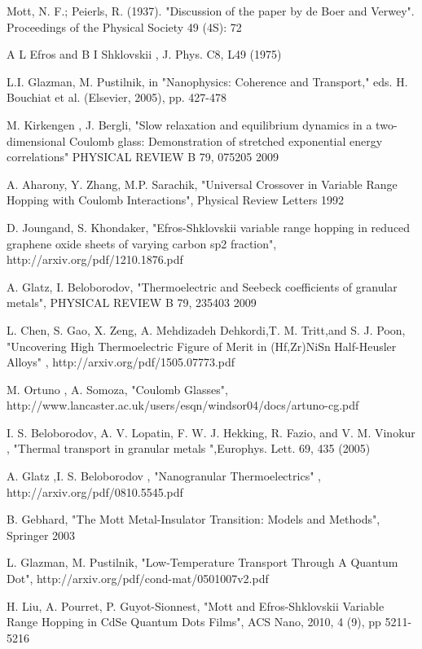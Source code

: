 \begin{thebibliography}{10}
 Mott, N. F.; Peierls, R. (1937). "Discussion of the paper by de Boer and Verwey". Proceedings of the Physical Society 49 (4S): 72

 A L Efros and B I Shklovskii , J. Phys. C8, L49 (1975)

 L.I. Glazman, M. Pustilnik, in "Nanophysics: Coherence and Transport," eds. H. Bouchiat et al. (Elsevier, 2005), pp. 427-478

 M. Kirkengen , J. Bergli, "Slow relaxation and equilibrium dynamics in a two-dimensional Coulomb glass: Demonstration of stretched exponential energy correlations" PHYSICAL REVIEW B 79, 075205 2009

 A. Aharony, Y. Zhang, M.P. Sarachik, "Universal Crossover in Variable Range Hopping with Coulomb Interactions", Physical Review Letters 1992

 D. Joungand, S. Khondaker, "Efros-Shklovskii variable range hopping in reduced graphene oxide sheets of varying carbon sp2 fraction", http://arxiv.org/pdf/1210.1876.pdf

 A. Glatz, I. Beloborodov, "Thermoelectric and Seebeck coefficients of granular metals", PHYSICAL REVIEW B 79, 235403 2009

 L. Chen, S. Gao, X. Zeng, A. Mehdizadeh Dehkordi,T. M. Tritt,and S. J. Poon, "Uncovering High Thermoelectric Figure of Merit in (Hf,Zr)NiSn Half-Heusler Alloys" , http://arxiv.org/pdf/1505.07773.pdf

 M. Ortuno , A. Somoza, "Coulomb Glasses", http://www.lancaster.ac.uk/users/esqn/windsor04/docs/artuno-cg.pdf

 I. S. Beloborodov, A. V. Lopatin, F. W. J. Hekking, R. Fazio, and V. M. Vinokur , "Thermal transport in granular metals ",Europhys. Lett. 69, 435 (2005)

 A. Glatz ,I. S. Beloborodov , "Nanogranular Thermoelectrics" , http://arxiv.org/pdf/0810.5545.pdf

 B. Gebhard, "The Mott Metal-Insulator Transition: Models and Methods", Springer 2003

 L. Glazman, M. Pustilnik, "Low-Temperature Transport Through A Quantum Dot", http://arxiv.org/pdf/cond-mat/0501007v2.pdf

 H. Liu, A. Pourret, P. Guyot-Sionnest, "Mott and Efros-Shklovskii Variable Range Hopping in CdSe Quantum Dots Films", ACS Nano, 2010, 4 (9), pp 5211-5216


\end{thebibliography}
